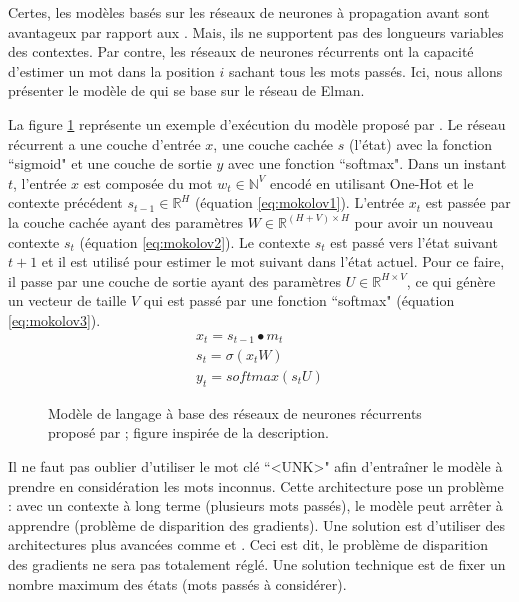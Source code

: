 \documentclass{KodeBook}
\begin{document}
Certes, les modèles basés sur les réseaux de neurones à propagation avant sont avantageux par rapport aux .
Mais, ils ne supportent pas des longueurs variables des contextes.
Par contre, les réseaux de neurones récurrents ont la capacité d'estimer un mot dans la position $i$ sachant tous les mots passés.
Ici, nous allons présenter le modèle de \citet{2010-mokolov-al} qui se base sur le réseau de Elman.

La figure \ref{fig:mokolov} représente un exemple d'exécution du modèle proposé par \citet{2010-mokolov-al}.
Le réseau récurrent a une couche d'entrée $x$, une couche cachée $s$ (l'état) avec la fonction ``sigmoid" et une couche de sortie $y$ avec une fonction ``softmax".
Dans un instant $t$, l'entrée $x$ est composée du mot $w_t \in \mathbb{N}^{V}$ encodé en utilisant One-Hot et le contexte précédent $s_{t-1} \in \mathbb{R}^{H}$ (équation \ref{eq:mokolov1}). 
L'entrée $x_t$ est passée par la couche cachée ayant des paramètres $W \in \mathbb{R}^{(H+V)\times H}$ pour avoir un nouveau contexte $s_t$ (équation \ref{eq:mokolov2}). 
Le contexte $s_t$ est passé vers l'état suivant $t+1$ et il est utilisé pour estimer le mot suivant dans l'état actuel.
Pour ce faire, il passe par une couche de sortie ayant des paramètres $U \in \mathbb{R}^{H\times V}$, ce qui génère un vecteur de taille $V$ qui est passé par une fonction ``softmax" (équation \ref{eq:mokolov3}).
%
\begin{align}
	x_t = s_{t-1} \bullet m_t \label{eq:mokolov1}\\
	s_t = \sigma(x_t W) \label{eq:mokolov2}\\
	y_t = softmax(s_t U) \label{eq:mokolov3}
\end{align}

\begin{figure}[ht]
	\centering
	\caption[Modèle de langage à base des réseaux de neurones récurrents]{Modèle de langage à base des réseaux de neurones récurrents proposé par \citet{2010-mokolov-al} ; figure inspirée de la description.}
	\label{fig:mokolov}
\end{figure}

Il ne faut pas oublier d'utiliser le mot clé ``\textless UNK\textgreater" afin d'entraîner le modèle à prendre en considération les mots inconnus. 
Cette architecture pose un problème : avec un contexte à long terme (plusieurs mots passés), le modèle peut arrêter à apprendre (problème de disparition des gradients).
Une solution est d'utiliser des architectures plus avancées comme  et . 
Ceci est dit, le problème de disparition des gradients ne sera pas totalement réglé.
Une solution technique est de fixer un nombre maximum des états (mots passés à considérer).
\end{document}
